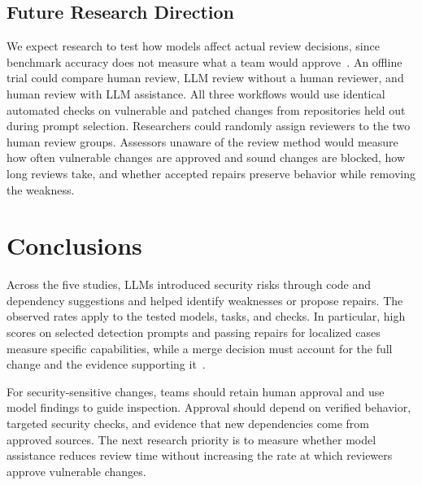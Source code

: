 \documentclass[conference]{IEEEtran}
\begin{document}
\subsection{Future Research Direction}
We expect research to test how models affect actual review decisions, since benchmark accuracy does not measure what a team would approve~\cite{ullah2024secllmholmes,pearce2023repair}. An offline trial could compare human review, LLM review without a human reviewer, and human review with LLM assistance. All three workflows would use identical automated checks on vulnerable and patched changes from repositories held out during prompt selection. Researchers could randomly assign reviewers to the two human review groups. Assessors unaware of the review method would measure how often vulnerable changes are approved and sound changes are blocked, how long reviews take, and whether accepted repairs preserve behavior while removing the weakness.

\section{Conclusions}\label{sec:conclusions}
Across the five studies, LLMs introduced security risks through code and dependency suggestions and helped identify weaknesses or propose repairs. The observed rates apply to the tested models, tasks, and checks. In particular, high scores on selected detection prompts and passing repairs for localized cases measure specific capabilities, while a merge decision must account for the full change and the evidence supporting it~\cite{pearce2025copilot,perry2023insecure,spracklen2025packages,ullah2024secllmholmes,pearce2023repair}.

For security-sensitive changes, teams should retain human approval and use model findings to guide inspection. Approval should depend on verified behavior, targeted security checks, and evidence that new dependencies come from approved sources. The next research priority is to measure whether model assistance reduces review time without increasing the rate at which reviewers approve vulnerable changes.



\end{document}
